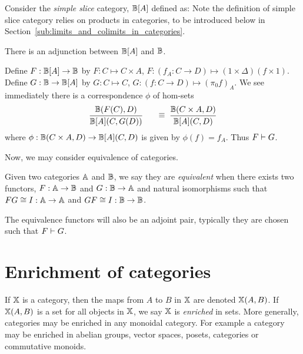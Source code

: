 \begin{example}\label{ex:simple-slice-adjoint}
  Consider the  \emph{simple slice} category\cite{blute2009cartesian}, $\mathbb{B}[A]$  defined as:
  Note the definition of simple slice category relies on products in categories, to be introduced
  below in Section~\ref{sub:limits_and_colimits_in_categories}.

  There is an adjunction between $\mathbb{B}[A]$ and $\mathbb{B}$.

  Define $F:\mathbb{B}[A]\to \mathbb{B}$ by $F:C \mapsto C\times A$, $F:(f_A:C\to D) \mapsto (1\times \Delta) (f\times
  1)$.
  Define $G:\mathbb{B} \to \mathbb{B}[A]$ by $G:C\mapsto C$, $G:(f:C\to D) \mapsto (\pi_0 f)_A$. We see immediately
  there is a  correspondence $\phi$ of hom-sets
  \[
    \infer{\B[A](C,G(D))}{\B(F(C), D)}
    \qquad \raisebox{8pt}{$\equiv$}\ \ \infer{\B[A](C,D)}{\B(C\times A, D)}
  \]
  where $\phi:\mathbb{B}(C\times A, D)\to\mathbb{B}[A](C,D)$ is given by $\phi(f) = f_A$.
  Thus $F\vdash G$.
\end{example}

Now, we may consider equivalence of categories.

\begin{definition}\label{def:equivalence_of_categories}
  Given two categories $\mathbb{A}$ and $\mathbb{B}$, we say they are \emph{equivalent} when there exists two
  functors, $F:\mathbb{A} \to \mathbb{B}$ and $G:\mathbb{B} \to \mathbb{A}$ and natural isomorphisms such that $F G \cong I:\mathbb{A} \to
  \mathbb{A}$ and $G F \cong I:\mathbb{B} \to \mathbb{B}$.
\end{definition}


The equivalence functors will also be an adjoint pair, typically they are chosen such that
$F\vdash G$.

\section{Enrichment of categories} %
\label{sub:enrichement_of_categories}

If $\mathbb{X}$ is a category, then the maps from $A$ to $B$ in $\mathbb{X}$ are denoted $\mathbb{X}(A,B)$.
If $\mathbb{X}(A,B)$ is a set for all objects in $\mathbb{X}$, we say $\mathbb{X}$ is \emph{enriched} in sets. More generally,
categories may be enriched in any monoidal category. For example a category may be
enriched in abelian groups, vector spaces, posets, categories or commutative monoids.

